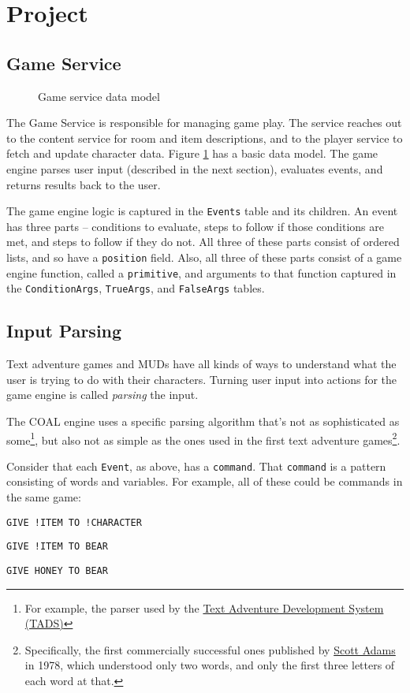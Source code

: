 \documentclass{article}
\newcommand{\enterProblemHeader}[1]{
}
\newcommand{\exitProblemHeader}[1]{
\nobreak\extramarks{#1}{}\nobreak
}
\newcounter{homeworkProblemCounter} %
\newcommand{\homeworkProblemName}{}
\newenvironment{homeworkProblem}[1][Problem \arabic{homeworkProblemCounter}]{ %
\stepcounter{homeworkProblemCounter} %
\renewcommand{\homeworkProblemName}{#1} %
\section{\homeworkProblemName} %
\enterProblemHeader{\homeworkProblemName} %
}{
\exitProblemHeader{\homeworkProblemName} %
}
\newcommand{\homeworkSectionName}{}
\newenvironment{homeworkSection}[1]{ %
\renewcommand{\homeworkSectionName}{#1} %
\subsection{\homeworkSectionName} %
\enterProblemHeader{\homeworkProblemName\ [\homeworkSectionName]} %
}{
\enterProblemHeader{\homeworkProblemName} %
}
\begin{document}
\begin{homeworkProblem}[Project]
\begin{homeworkSection}{Game Service}
\begin{figure}
	\caption{Game service data model}
	\label{fig:game-db}
	\end{figure}

	The Game Service is responsible for managing game play. The service reaches out to the content service for room and item descriptions, and to the player service to fetch and update character data. Figure \ref{fig:game-db} has a basic data model. The game engine parses user input (described in the next section), evaluates events, and returns results back to the user.

	The game engine logic is captured in the \texttt{Events} table and its children. An event has three parts -- conditions to evaluate, steps to follow if those conditions are met, and steps to follow if they do not. All three of these parts consist of ordered lists, and so have a \texttt{position} field. Also, all three of these parts consist of a game engine function, called a \texttt{primitive}, and arguments to that function captured in the \texttt{ConditionArgs}, \texttt{TrueArgs}, and \texttt{FalseArgs} tables.

\end{homeworkSection}

\begin{homeworkSection}{Input Parsing}
	Text adventure games and MUDs have all kinds of ways to understand what the user is trying to do with their characters. Turning user input into actions for the game engine is called \textit{parsing} the input.

	The COAL engine uses a specific parsing algorithm that's not as sophisticated as some\footnote{For example, the parser used by the \href{http://www.tads.org/t2doc/doc/parser.htm}{Text Adventure Development System (TADS)}}, but also not as simple as the ones used in the first text adventure games\footnote{Specifically, the first commercially successful ones published by \href{https://en.wikipedia.org/wiki/Scott_Adams_(game_designer)}{Scott Adams} in 1978, which understood only two words, and only the first three letters of each word at that.}.

	Consider that each \texttt{Event}, as above, has a \texttt{command}. That \texttt{command} is a pattern consisting of words and variables. For example, all of these could be commands in the same game:

	\begin{compactitem}
		\item \texttt{GIVE !ITEM TO !CHARACTER}
		\item \texttt{GIVE !ITEM TO BEAR}
		\item \texttt{GIVE HONEY TO BEAR}
	\end{compactitem}


\end{homeworkSection}
\end{homeworkProblem}
\end{document}
